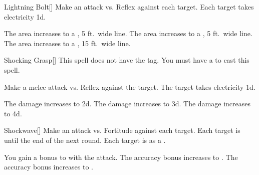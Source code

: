 \lowercase{\hypertarget{spell:Lightning Bolt}{}}\label{spell:Lightning Bolt}
\begin{freeability}[Rank 2]{\hypertarget{spell:Lightning Bolt}{Lightning Bolt}}[]
Make an attack vs. Reflex against each target.
\hit Each target takes electricity  \minus1d.

\rankline
{} The area increases to a \areahuge, 5 ft.\ wide line.
 The area increases to a \areaext, 5 ft.\ wide line.
 The area increases to a \areaext, 15 ft.\ wide line.

\end{freeability}
\vspace{0.25em}



\lowercase{\hypertarget{spell:Shocking Grasp}{}}\label{spell:Shocking Grasp}
\begin{freeability}[Rank 2]{\hypertarget{spell:Shocking Grasp}{Shocking Grasp}}[]
This spell does not have the  tag.
You must have a  to cast this spell.

Make a melee attack vs. Reflex against the target.
\hit The target takes electricity  \plus1d.

\rankline
{} The damage increases to  \plus2d.
 The damage increases to  \plus3d.
 The damage increases to  \plus4d.

\end{freeability}
\vspace{0.25em}



\lowercase{\hypertarget{spell:Shockwave}{}}\label{spell:Shockwave}
\begin{freeability}[Rank 2]{\hypertarget{spell:Shockwave}{Shockwave}}[]
Make an attack vs. Fortitude against each target.
\hit Each target is  until the end of the next round.
\crit Each target is  as a .

\rankline
{} You gain a  bonus to  with the attack.
 The accuracy bonus increases to .
 The accuracy bonus increases to .

\end{freeability}
\vspace{0.25em}



